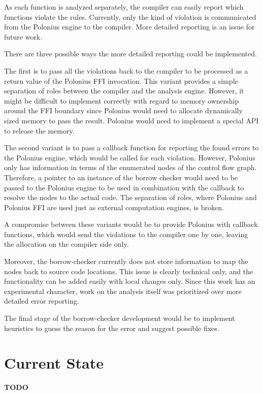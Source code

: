 \documentclass[
  11pt,
]{report}
\begin{document}
As each function is analyzed separately, the compiler can easily report
which functions violate the rules. Currently, only the kind of violation
is communicated from the Polonius engine to the compiler. More detailed
reporting is an issue for future work.

There are three possible ways the more detailed reporting could be
implemented.

The first is to pass all the violations back to the compiler to be
processed as a return value of the Polonius FFI invocation. This variant
provides a simple separation of roles between the compiler and the
analysis engine. However, it might be difficult to implement correctly
with regard to memory ownership around the FFI boundary since Polonius
would need to allocate dynamically sized memory to pass the result.
Polonius would need to implement a special API to release the memory.

The second variant is to pass a callback function for reporting the
found errors to the Polonius engine, which would be called for each
violation. However, Polonius only has information in terms of the
enumerated nodes of the control flow graph. Therefore, a pointer to an
instance of the borrow checker would need to be passed to the Polonius
engine to be used in combination with the callback to resolve the nodes
to the actual code. The separation of roles, where Polonius and Polonius
FFI are used just as external computation engines, is broken.

A compromise between these variants would be to provide Polonius with
callback functions, which would send the violations to the compiler one
by one, leaving the allocation on the compiler side only.

Moreover, the borrow-checker currently does not store information to map
the nodes back to source code locations. This issue is clearly technical
only, and the functionality can be added easily with local changes only.
Since this work has an experimental character, work on the analysis
itself was prioritized over more detailed error reporting.

The final stage of the borrow-checker development would be to implement
heuristics to guess the reason for the error and suggest possible fixes.

\chapter{Current State}\label{current-state}

\textbf{TODO}
\end{document}
